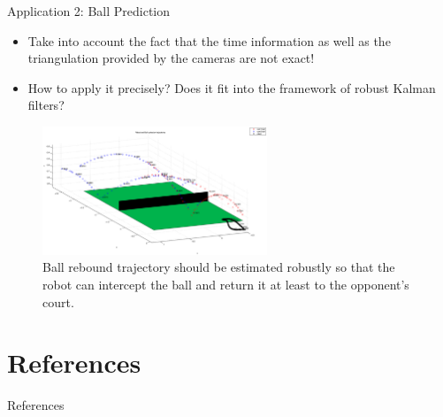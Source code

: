 \documentclass[handout]{beamer}
\begin{document}
%
\begin{frame}{Application 2: Ball Prediction}
\begin{itemize}
\item Take into account the fact that the time information as well as the triangulation provided by the cameras are not exact!
\item How to apply it precisely? Does it fit into the framework of robust Kalman filters?
\end{itemize}
\begin{figure}
\centering
\includegraphics[width=0.6\textwidth]{ballPrediction.eps}%
\caption{Ball rebound trajectory should be estimated robustly so that the robot can intercept the ball and return it at least to the opponent's court.}
\end{figure}
\end{frame}


\section{References}
\begin{frame}[allowframebreaks]{References}
\nocite{*}
\def\newblock{\hskip .11em plus .33em minus .07em}

\end{frame}
%
\end{document}
